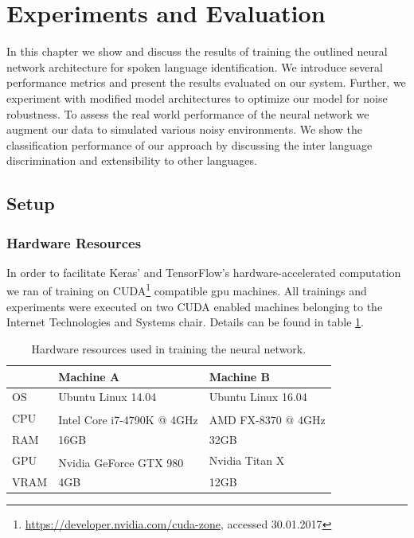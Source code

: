\section{Experiments and Evaluation} 
\label{sec:evaluation}
In this chapter we show and discuss the results of training the outlined neural network architecture for spoken language identification. We introduce several performance metrics and present the results evaluated on our system.
Further, we experiment with modified model architectures to optimize our model for noise robustness. To assess the real world performance of the neural network we augment our data to simulated various noisy environments. We show the classification performance of our approach by discussing the inter language discrimination and extensibility to other languages.     

\subsection{Setup} 
\label{sec:setup}

\subsubsection{Hardware Resources}
\label{sec:hardware}
	In order to facilitate Keras' and TensorFlow's hardware-accelerated computation we ran of training on CUDA\footnote{\url{https://developer.nvidia.com/cuda-zone}, accessed 30.01.2017} compatible \ac{gpu} machines. All trainings and experiments were executed on two CUDA enabled machines belonging to the Internet Technologies and Systems chair. Details can be found in table \ref{tab:hardware}.
		
	\begin{table}[h]
	\centering
	\begin{tabularx}{\textwidth}{lll}
	\toprule
	  		& Machine A 					& Machine B \\ \midrule
	OS  	& Ubuntu Linux 14.04 		& Ubuntu Linux 16.04 \\
	CPU  	& Intel\textsuperscript{\textregistered} Core\textsuperscript{\texttrademark} i7-4790K @ 4GHz 	& AMD FX\textsuperscript{\texttrademark}-8370  @ 4GHz \\
	RAM  	& 16GB 						& 32GB \\
	GPU  	& Nvidia GeForce\textsuperscript{\textregistered} GTX 980 	& Nvidia Titan X \\
	VRAM  	& 4GB 						& 12GB \\
	\bottomrule
	\end{tabularx}
	\caption{Hardware resources used in training the neural network.}
	\label{tab:hardware}
	\end{table}

